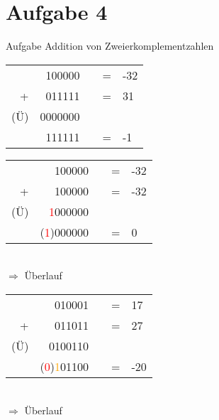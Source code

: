 
\section{Aufgabe 4}

\setcounter{exercise}{1}

\begin{frame}[allowframebreaks]{Aufgabe \thesection}{Addition von Zweierkomplementzahlen}
\begin{solution}
    \begin{tabular}{rrcrl}
        &100000&&=&-32\\
        +&011111&&=&31\\
        (Ü)&0000000\\
        \hline
        &111111&&=&-1
        
    \end{tabular}
\end{solution}
\begin{solution}
    \begin{tabular}{rrcrl}
        &100000&&=&-32\\
        +&100000&&=&-32\\
        (Ü)&\textcolor{red}{1}000000\\
        \hline
        &(\textcolor{red}{1})000000&&=&0
    \end{tabular}\\
    $\Rightarrow$ Überlauf
\end{solution}
\begin{solution}
    \begin{tabular}{rrcrl}
        &010001&&=&17\\
        +&011011&&=&27\\
        (Ü)&0100110\\
        \hline
        &(\textcolor{red}{0})\textcolor{orange}{1}01100&&=&-20
    \end{tabular}\\
    $\Rightarrow$ Überlauf
\end{solution}
\end{frame}

